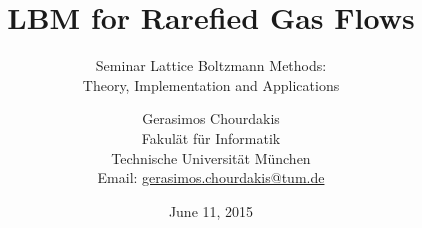 \documentclass[a4paper,pdftex]{scrartcl}
\begin{document}
\title{LBM for Rarefied Gas Flows}
\subtitle{Seminar Lattice Boltzmann Methods:\\Theory, Implementation and Applications}
\date{June 11, 2015}
\author{
Gerasimos Chourdakis\\
Fakul\"at f\"ur Informatik\\Technische Universit\"at M\"unchen\\
Email: \href{mailto:gerasimos.chourdakis@tum.de}{gerasimos.chourdakis@tum.de} 
}

\maketitle

\thispagestyle{empty}



















\end{document}
